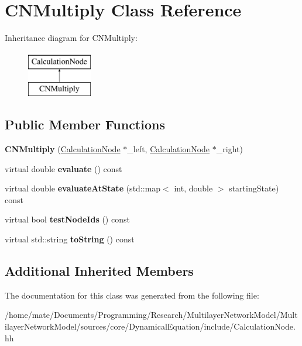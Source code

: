 \hypertarget{classCNMultiply}{}\section{C\+N\+Multiply Class Reference}
\label{classCNMultiply}
Inheritance diagram for C\+N\+Multiply\+:\begin{figure}[H]
\begin{center}
\leavevmode
\includegraphics[height=2.000000cm]{classCNMultiply}
\end{center}
\end{figure}
\subsection*{Public Member Functions}
\begin{DoxyCompactItemize}
\item 
{\bfseries C\+N\+Multiply} (\hyperlink{classCalculationNode}{Calculation\+Node} $\ast$\+\_\+left, \hyperlink{classCalculationNode}{Calculation\+Node} $\ast$\+\_\+right)\hypertarget{classCNMultiply_a440c0e25b1fb642c95757a9118634874}{}\label{classCNMultiply_a440c0e25b1fb642c95757a9118634874}

\item 
virtual double {\bfseries evaluate} () const \hypertarget{classCNMultiply_a51ce205165bfa5842002721332c14f5c}{}\label{classCNMultiply_a51ce205165bfa5842002721332c14f5c}

\item 
virtual double {\bfseries evaluate\+At\+State} (std\+::map$<$ int, double $>$ starting\+State) const \hypertarget{classCNMultiply_a8daa0d3ea8f08db43b6e168f6ca9527b}{}\label{classCNMultiply_a8daa0d3ea8f08db43b6e168f6ca9527b}

\item 
virtual bool {\bfseries test\+Node\+Ids} () const \hypertarget{classCNMultiply_a9ffc252a3cc6ccdb3ef9ee4700f0ac18}{}\label{classCNMultiply_a9ffc252a3cc6ccdb3ef9ee4700f0ac18}

\item 
virtual std\+::string {\bfseries to\+String} () const \hypertarget{classCNMultiply_a55edebadef3ea3df839dd8779f1e2e13}{}\label{classCNMultiply_a55edebadef3ea3df839dd8779f1e2e13}

\end{DoxyCompactItemize}
\subsection*{Additional Inherited Members}


The documentation for this class was generated from the following file\+:\begin{DoxyCompactItemize}
\item 
/home/mate/\+Documents/\+Programming/\+Research/\+Multilayer\+Network\+Model/\+Multilayer\+Network\+Model/sources/core/\+Dynamical\+Equation/include/Calculation\+Node.\+hh\end{DoxyCompactItemize}
